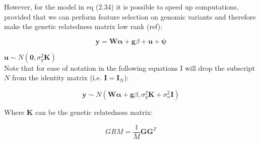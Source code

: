 However, for the model in eq (2.34) it is possible to speed up computations, provided that we can perform feature selection on genomic variants and therefore make the genetic relatedness matrix low rank (ref): 

\begin{equation}\label{eq22:Linear_mixed_model}
 \mathbf{y} =  \mathbf{W}\boldsymbol{\alpha} + \mathbf{g}\beta + \mathbf{u} + \boldsymbol{\psi} 
\end{equation}


$\mathbf{u} \sim N(\mathbf{0}, \sigma_g^2\mathbf{K})$\\


Note that for ease of notation in the following equations I will drop the subscript $N$ from the identity matrix (i.e. $\mathbf{I} = \mathbf{I}_N$):

\begin{equation}\label{eq34}
 \mathbf{y} \sim  N(\mathbf{W}\boldsymbol{\alpha} + \mathbf{g}\beta, \sigma_g^2\mathbf{K} + \sigma_n^2\mathbf{I})
\end{equation}

Where $\mathbf{K}$ can be the genetic relatedness matrix:

\begin{equation}
    GRM = \frac{1}{M}\mathbf{G}\mathbf{G}^T
\end{equation}







